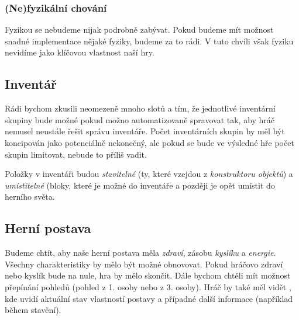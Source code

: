 \subsubsection{(Ne)fyzikální chování}

Fyzikou se nebudeme nijak podrobně zabývat. Pokud budeme mít možnost snadné implementace nějaké fyziky, budeme za to rádi. V tuto chvíli však fyziku nevidíme jako klíčovou vlastnost naší hry. 

\subsection{Inventář}

Rádi bychom zkusili neomezeně mnoho slotů a tím, že jednotlivé inventární skupiny bude možné pokud možno automatizovaně spravovat tak, aby hráč nemusel neustále řešit správu inventáře. Počet inventárních skupin by měl být koncipován jako potenciálně nekonečný, ale pokud se bude ve výsledné hře počet skupin limitovat, nebude to příliš vadit.

Položky v inventáři budou \textit{stavitelné} (ty, které vzejdou z \textit{konstruktoru objektů}) a \textit{umístitelné} (bloky, které je možné  do inventáře a později je opět umístit do herního světa.

\subsection{Herní postava}
\label{subsec:postava}
Budeme chtít, aby naše herní postava měla \textit{zdraví}, zásobu \textit{kyslíku} a \textit{energie}. Všechny charakteristiky by mělo být možné obnovovat. Pokud hráčovo zdraví nebo kyslík bude na nule, hra by mělo skončit. Dále bychom chtěli mít možnost přepínání pohledů (pohled z 1. osoby nebo z 3. osoby). Hráč by také měl vidět \HUD{}, kde uvidí aktuální stav vlastností postavy a případné další informace (například během stavění).




